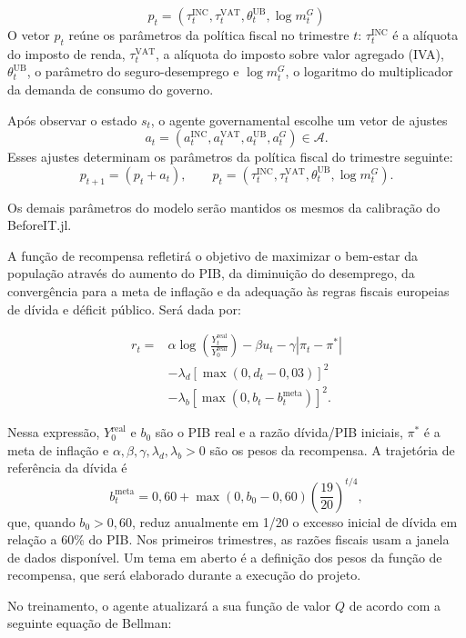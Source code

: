 \documentclass[12pt,a4paper]{article}
\begin{document}
\[
p_t =
\left(
\tau_t^{\mathrm{INC}},
\tau_t^{\mathrm{VAT}},
\theta_t^{\mathrm{UB}},
\log m_t^G
\right)
\]
O vetor \(p_t\) reúne os parâmetros da política fiscal no trimestre \(t\): \(\tau_t^{\mathrm{INC}}\) é a alíquota do imposto de renda, \(\tau_t^{\mathrm{VAT}}\), a alíquota do imposto sobre valor agregado (IVA), \(\theta_t^{\mathrm{UB}}\), o parâmetro do seguro-desemprego e \(\log m_t^G\), o logaritmo do multiplicador da demanda de consumo do governo.


Após observar o estado \(s_t\), o agente governamental escolhe
um vetor de ajustes
\[
a_t =
\left(
a_t^{\mathrm{INC}},
a_t^{\mathrm{VAT}},
a_t^{\mathrm{UB}},
a_t^G
\right) \in \mathcal{A}.
\]
Esses ajustes determinam os parâmetros da política fiscal do
trimestre seguinte:
\[
p_{t+1}
=
\left(p_t+a_t\right),
\qquad
p_t =
\left(
\tau_t^{\mathrm{INC}},
\tau_t^{\mathrm{VAT}},
\theta_t^{\mathrm{UB}},
\log m_t^G
\right).
\]

Os demais parâmetros do modelo serão mantidos os mesmos da calibração do BeforeIT.jl.

A função de recompensa refletirá o objetivo de maximizar o bem-estar da população através do aumento do PIB, da diminuição do desemprego, da convergência para a meta de inflação e da adequação às regras fiscais europeias de dívida e déficit público. Será dada por:

\[
\begin{aligned}
r_t={}&\alpha\log\left(\frac{Y_t^{\mathrm{real}}}{Y_0^{\mathrm{real}}}\right)
-\beta u_t-\gamma|\pi_t-\pi^*|\\
&-\lambda_d\left[\max\left(0,d_t-0{,}03\right)\right]^2\\
&-\lambda_b\left[\max\left(0,b_t-b_t^{\mathrm{meta}}\right)\right]^2.
\end{aligned}
\]

Nessa expressão, \(Y_0^{\mathrm{real}}\) e \(b_0\) são o PIB real e a razão dívida/PIB iniciais, \(\pi^*\) é a meta de inflação e \(\alpha,\beta,\gamma,\lambda_d,\lambda_b>0\) são os pesos da recompensa. A trajetória de referência da dívida é
\[
b_t^{\mathrm{meta}}=0{,}60+\max(0,b_0-0{,}60)
\left(\frac{19}{20}\right)^{t/4},
\]
que, quando \(b_0>0{,}60\), reduz anualmente em 1/20 o excesso inicial de dívida em relação a 60\% do PIB. Nos primeiros trimestres, as razões fiscais usam a janela de dados disponível. Um tema em aberto é a definição dos pesos da função de recompensa, que será elaborado durante a execução do projeto.

No treinamento, o agente atualizará a sua função de valor \(Q\) de acordo com a seguinte equação de Bellman:
\end{document}
